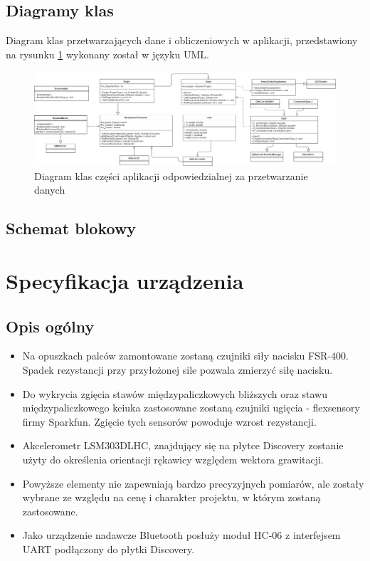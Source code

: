 \documentclass[12pt,a4paper]{article}
\begin{document}
\newpage
\subsection{Diagramy klas}
Diagram klas przetwarzających dane i obliczeniowych w aplikacji, przedstawiony na rysunku \ref{fig:classdiagram} wykonany został w języku UML.\\
\begin{figure}[!htb]
\centering
\includegraphics[angle=90,height=0.8\textheight]{./ClassDiagram.png}
\caption{Diagram klas części aplikacji odpowiedzialnej za przetwarzanie danych\label{fig:classdiagram}}
\end{figure}

\subsection{Schemat blokowy}

\section{Specyfikacja urządzenia}

\subsection{Opis ogólny}
\begin{itemize}
\item Na opuszkach palców zamontowane zostaną czujniki siły nacisku FSR-400. Spadek rezystancji przy przyłożonej sile pozwala zmierzyć siłę nacisku.
\item Do wykrycia zgięcia stawów międzypaliczkowych bliższych oraz stawu międzypaliczkowego kciuka zastosowane zostaną czujniki ugięcia - flexsensory firmy Sparkfun. Zgięcie tych sensorów powoduje wzrost rezystancji.
\item Akcelerometr LSM303DLHC, znajdujący się na płytce Discovery zostanie użyty do określenia orientacji rękawicy względem wektora grawitacji.
\item Powyższe elementy nie zapewniają bardzo precyzyjnych pomiarów, ale zostały wybrane ze względu na cenę i charakter projektu, w którym zostaną zastosowane.
\item Jako urządzenie nadawcze Bluetooth posłuży moduł HC-06 z interfejsem UART podłączony do płytki Discovery.
\end{itemize}
\end{document}
